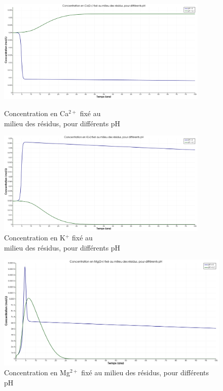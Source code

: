 \documentclass{article}
\begin{document}
\begin{figure}[H]
    \centering
    \begin{minipage}{0.5\textwidth}
        \centering
        \includegraphics[width=0.9\textwidth]{III_B_2_15.png} 
        \caption{Concentration en Ca$^{2+}$ fixé au \\milieu des résidus, pour différents pH}
        \label{fig:Ca_residus_comparaison}
    \end{minipage}\hfill
    \begin{minipage}{0.5\textwidth}
        \centering
        \includegraphics[width=0.9\textwidth]{III_B_2_16.png} 
        \caption{Concentration en K$^{+}$ fixé au \\milieu des résidus, pour différents pH}
        \label{fig:K_residus_comparaison}
    \end{minipage}
\end{figure}

\begin{figure}[H]
    \centering
    \includegraphics[width=0.5\linewidth]{III_B_2_17.png}
    \caption{Concentration en Mg$^{2+}$ fixé au milieu des résidus, pour différents pH}
    \label{fig:Mg_residus_comparaison}
\end{figure}
\end{document}
